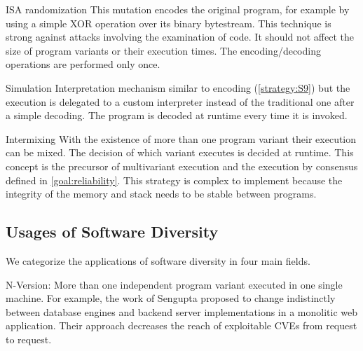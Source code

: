 \begin{strategy}{ISA randomization}
    \label{strategy:S8}
    \normalfont
    This mutation encodes the original program, for example by using a simple XOR operation over its binary bytestream. This technique is strong against attacks involving the examination of code. It should not affect the size of program variants or their execution times. The encoding/decoding operations are performed only once.
\end{strategy}


\begin{strategy}{Simulation}
    \label{strategy:S9}
    \normalfont
    Interpretation mechanism similar to encoding (\autoref{strategy:S9}) but the execution is delegated to a custom interpreter instead of the traditional one after a simple decoding. The program is decoded at runtime every time it is invoked.
\end{strategy}


\begin{strategy}{Intermixing}
    \label{strategy:S10}
    \normalfont
    With the existence of more than one program variant their execution can be mixed. The decision of which variant executes is decided at runtime. This concept is the precursor of multivariant execution and the execution by consensus defined in \autoref{goal:reliability}. This strategy is 
    complex to implement because the integrity of the memory and stack needs to be stable between programs.
\end{strategy}

\subsection*{Usages of Software Diversity}

We categorize the applications of software diversity in four main fields.

\begin{usage}{N-Version:}
    \label{usage:n-version}
    \normalfont
    More than one independent program variant executed in one single machine. For example, the work of Sengupta \etal \cite{10.5555/3091125.3091155} proposed to change indistinctly between database engines and backend server implementations in a monolitic web application. Their approach decreases the reach of exploitable CVEs from request to request.
\end{usage}


